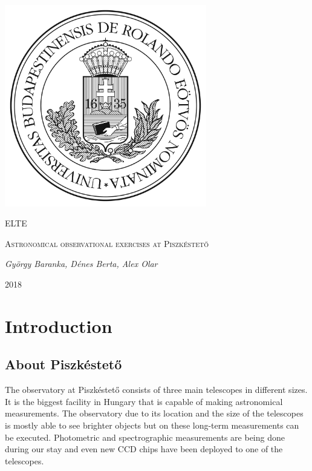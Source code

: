 \documentclass[a4paper,12pt]{article}
\begin{document}
\linespread{1.25}

\begin{titlepage}

    \centering
    \includegraphics[width=0.66\textwidth]{elte.jpg}\par\vspace{1cm}
    {\scshape\LARGE ELTE \par}
    \vspace{3cm}
    {\scshape\Large Astronomical observational exercises at Piszkéstető\par}
    \vspace{1cm}
    {\large\itshape György Baranka, Dénes Berta, Alex Olar\par}
    \vspace{3cm}
    {\large 2018 \par}

\end{titlepage}

\tableofcontents

\newpage

\section{Introduction}

\subsection{About Piszkéstető}

\par The observatory at Piszkéstető consists of three main telescopes
in different sizes. It is the biggest facility in Hungary that is capable of
making astronomical measurements. The observatory due to its location and the size of the telescopes
is mostly able to see brighter objects but on these long-term measurements can
be executed. Photometric and spectrographic measurements are being done during our
stay and even new CCD chips have been deployed to one of the telescopes.
\end{document}
